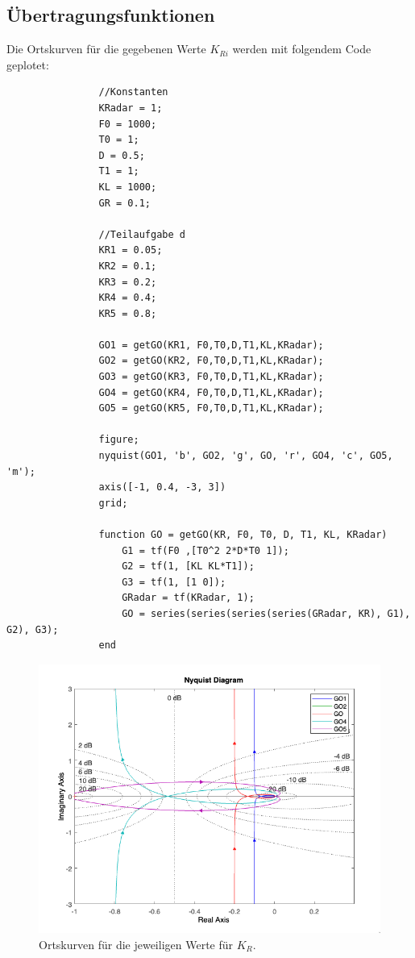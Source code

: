 \documentclass{article}
\begin{document}
		\subsection{Übertragungsfunktionen}
			Die Ortskurven für die gegebenen Werte $K_{Ri}$ werden mit folgendem Code geplotet:
			\begin{lstlisting}
				//Konstanten
				KRadar = 1;
				F0 = 1000;
				T0 = 1;
				D = 0.5;
				T1 = 1;
				KL = 1000;
				GR = 0.1;

				//Teilaufgabe d
				KR1 = 0.05;
				KR2 = 0.1;
				KR3 = 0.2;
				KR4 = 0.4;
				KR5 = 0.8;

				GO1 = getGO(KR1, F0,T0,D,T1,KL,KRadar);
				GO2 = getGO(KR2, F0,T0,D,T1,KL,KRadar);
				GO3 = getGO(KR3, F0,T0,D,T1,KL,KRadar);
				GO4 = getGO(KR4, F0,T0,D,T1,KL,KRadar);
				GO5 = getGO(KR5, F0,T0,D,T1,KL,KRadar);

				figure;
				nyquist(GO1, 'b', GO2, 'g', GO, 'r', GO4, 'c', GO5, 'm');
				axis([-1, 0.4, -3, 3])
				grid;

				function GO = getGO(KR, F0, T0, D, T1, KL, KRadar)
				    G1 = tf(F0 ,[T0^2 2*D*T0 1]);
					G2 = tf(1, [KL KL*T1]);
				    G3 = tf(1, [1 0]);
				    GRadar = tf(KRadar, 1);
				    GO = series(series(series(series(GRadar, KR), G1), G2), G3);
				end
			\end{lstlisting}
\newpage
			\begin{figure}[h]
			    \includegraphics[scale=0.7, center]{./Ortskurven_4_d.png}
			    \caption{Ortskurven für die jeweiligen Werte für $K_R$.}
			    \label{fig:label}
			\end{figure}
\newpage
\end{document}
